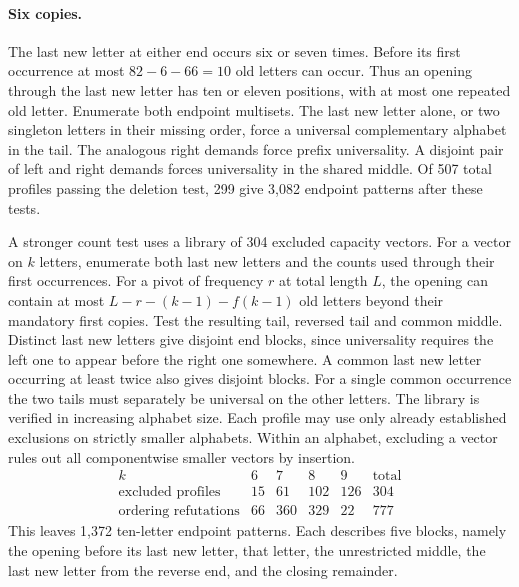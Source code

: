 \documentclass[11pt]{article}
\begin{document}
\paragraph{Six copies.}
The last new letter at either end occurs six or seven times. Before its first occurrence at most $82-6-66=10$ old letters can occur. Thus an opening through the last new letter has ten or eleven positions, with at most one repeated old letter. Enumerate both endpoint multisets. The last new letter alone, or two singleton letters in their missing order, force a universal complementary alphabet in the tail. The analogous right demands force prefix universality. A disjoint pair of left and right demands forces universality in the shared middle. Of 507 total profiles passing the deletion test, 299 give 3,082 endpoint patterns after these tests.

A stronger count test uses a library of 304 excluded capacity vectors. For a vector on $k$ letters, enumerate both last new letters and the counts used through their first occurrences. For a pivot of frequency $r$ at total length $L$, the opening can contain at most $L-r-(k-1)-f(k-1)$ old letters beyond their mandatory first copies. Test the resulting tail, reversed tail and common middle. Distinct last new letters give disjoint end blocks, since universality requires the left one to appear before the right one somewhere. A common last new letter occurring at least twice also gives disjoint blocks. For a single common occurrence the two tails must separately be universal on the other letters. The library is verified in increasing alphabet size. Each profile may use only already established exclusions on strictly smaller alphabets. Within an alphabet, excluding a vector rules out all componentwise smaller vectors by insertion.
\[
\begin{array}{c|rrrr|r}
k&6&7&8&9&\text{total}\\ \hline
\text{excluded profiles}&15&61&102&126&304\\
\text{ordering refutations}&66&360&329&22&777
\end{array}
\]
This leaves 1,372 ten-letter endpoint patterns. Each describes five blocks, namely the opening before its last new letter, that letter, the unrestricted middle, the last new letter from the reverse end, and the closing remainder.
\end{document}
